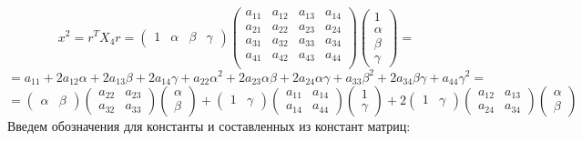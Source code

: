 \documentclass[pdftex,ptm,12pt,a4paper]{report}
\begin{document}
    \[
      x^2 = r^T X_4 r =
        \begin{pmatrix} 1 & \alpha & \beta & \gamma \end{pmatrix}
        \begin{pmatrix}
              a_{11} & a_{12} & a_{13} & a_{14} \\
              a_{21} & a_{22} & a_{23} & a_{24} \\
              a_{31} & a_{32} & a_{33} & a_{34} \\
              a_{41} & a_{42} & a_{43} & a_{44} \\

        \end{pmatrix}
        \begin{pmatrix} 1 \\ \alpha \\ \beta \\ \gamma \end{pmatrix}  =
    \]\[
        = a_{11} + 2a_{12}\alpha + 2a_{13}\beta + 2a_{14}\gamma +
                 a_{22}\alpha^2 + 2a_{23}\alpha\beta + 2a_{24}\alpha\gamma +
                                  a_{33}\beta^2 + 2a_{34}\beta\gamma +
                                                  a_{44}\gamma^2  =
    \]\[
        = \begin{pmatrix} \alpha & \beta \end{pmatrix}
          \begin{pmatrix}
              a_{22} & a_{23} \\
              a_{32} & a_{33}
        \end{pmatrix}
        \begin{pmatrix} \alpha \\ \beta \end{pmatrix}
      + \begin{pmatrix} 1 & \gamma \end{pmatrix}
          \begin{pmatrix}
              a_{11} & a_{14} \\
              a_{14} & a_{44}
        \end{pmatrix}
        \begin{pmatrix} 1 \\ \gamma \end{pmatrix}
      + 2\begin{pmatrix} 1 & \gamma \end{pmatrix}
          \begin{pmatrix}
              a_{12} & a_{13} \\
              a_{24} & a_{34}
        \end{pmatrix}
        \begin{pmatrix} \alpha \\ \beta \end{pmatrix}
    \]
    Введем обозначения для константы и составленных из констант матриц:
\end{document}
